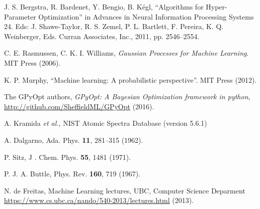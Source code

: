 \begin{thebibliography}{9}
J. S. Bergstra, R. Bardenet, Y. Bengio, B. Kégl, 
``Algorithms for Hyper-Parameter Optimization'' in Advances in Neural 
Information Processing Systems 24. Eds: J. Shawe-Taylor, R. S. Zemel, 
P. L. Bartlett, F. Pereira, K. Q. Weinberger, Eds. Curran Associates, 
Inc., 2011, pp. 2546--2554. 

C. E. Rasmussen, C. K. I. Williams, 
\textit{Gaussian Processes for Machine Learning}. MIT Press (2006).

K. P. Murphy, 
``Machine learning: A probabilistic perspective''. 
MIT Press (2012).

The GPyOpt authors,
\textit{GPyOpt: A Bayesian Optimization framework in python},
\href{http://github.com/SheffieldML/GPyOpt}
{http://github.com/SheffieldML/GPyOpt} (2016).

A. Kramida \textit{et al.},
NIST Atomic Spectra Database (version 5.6.1) 

A. Dalgarno,
Ada. Phys. \textbf{11}, 281--315 (1962).

P. Sitz, 
J . Chem. Phys. \textbf{55}, 1481 (1971).

P. J. A. Buttle, 
Phys. Rev. \textbf{160}, 719 (1967).

N. de Freitas, 
Machine Learning lectures, UBC, Computer Science Deparment
\href{https://www.cs.ubc.ca/nando/540-2013/lectures.html}
{https://www.cs.ubc.ca/nando/540-2013/lectures.html} (2013).

\end{thebibliography}

